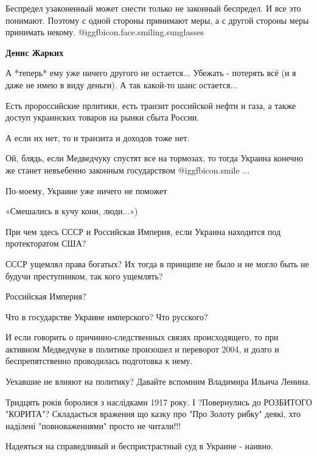 \begin{itemize}
\begin{itemize}

Беспредел узаконенный может снести только не законный беспредел. И все это
понимают. Поэтому с одной стороны принимают меры, а с другой стороны меры
принимать некому.  @igg{fbicon.face.smiling.sunglasses} 

\textbf{Денис Жарких} 

А *теперь* ему уже ничего другого не остается... Убежать - потерять всё (и я
даже не имею в виду деньги). А так какой-то шанс остается...

\end{itemize} %


Есть пророссийские прлитики, есть транзит российской нефти и газа, а также доступ
украинских товаров на рынки сбыта России.

А если их нет, то и транзита и доходов тоже нет.

Ой, блядь, если Медведчуку спустят все на тормозах, то тогда Украина конечно же
станет невъебенно законным государством  @igg{fbicon.smile} ...

По-моему, Украине уже ничего не поможет


«Смешались в кучу кони, люди...»)

При чем здесь СССР и Российская Империя, если Украина находится под
протекторатом США?

СССР ущемлял права богатых? Их тогда в принципе не было и не могло быть не
будучи преступником, так кого ущемлять?

Российская Империя?

Что в государстве Украине имперского? Что русского?

И если говорить о причинно-следственных связях происходящего, то при активном
Медведчуке в политике произошел и переворот 2004, и долго и беспрепятственно
проводилась подготовка к нему.

Уехавшие не влияют на политику? Давайте вспомним Владимира Ильича Ленина.


Тридцять років боролися з наслідками 1917 року. І ?Повернулись до РОЗБИТОГО
"КОРИТА"? Складається враження що казку про "Про Золоту рибку" деякі, хто
наділені "повноваженнями" просто не читали!!!

Надеяться на справедливый и беспристрастный суд в Украине - наивно.


\end{itemize}
